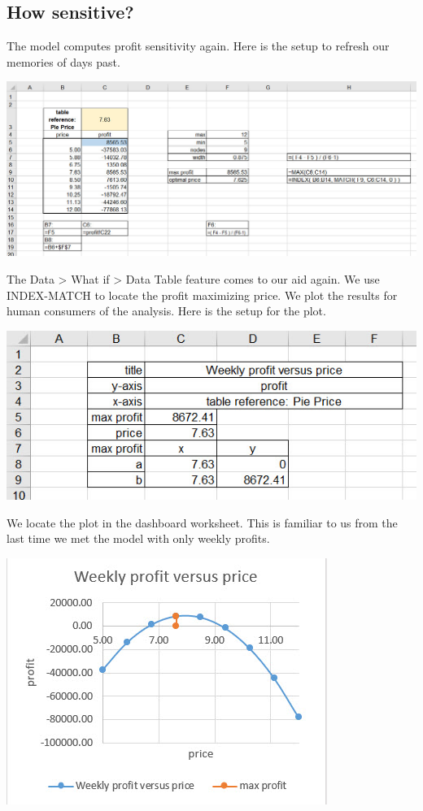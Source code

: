 \documentclass[
]{book}
\begin{document}
\hypertarget{how-sensitive}{%
\subsection{How sensitive?}\label{how-sensitive}}

The model computes profit sensitivity again. Here is the setup to refresh our memories of days past.

\includegraphics{images/02/pie-sensitivity-profit-result.jpg}

The Data \textgreater{} What if \textgreater{} Data Table feature comes to our aid again. We use INDEX-MATCH to locate the profit maximizing price. We plot the results for human consumers of the analysis. Here is the setup for the plot.

\includegraphics{images/02/pie-settings-profit-price-plot.jpg}

We locate the plot in the dashboard worksheet. This is familiar to us from the last time we met the model with only weekly profits.

\includegraphics{images/02/pie-dashboard-profit-plot.jpg}
\end{document}
